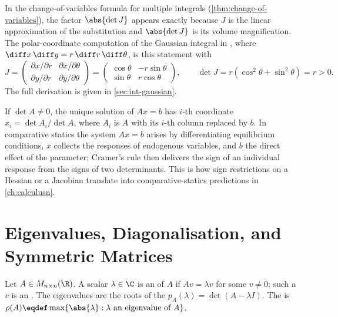 \begin{eg}\label{eg:det-jacobian}
	In the change-of-variables formula for multiple integrals
	(\autoref{thm:change-of-variables}), the factor $\abs{\det J}$ appears exactly
	because $J$ is the linear approximation of the substitution and $\abs{\det J}$
	is its volume magnification. The polar-coordinate computation of the Gaussian
	integral in \autocite[slides 91--93]{fukuda2026calculus}, where
	$\diff x\,\diff y=r\,\diff r\,\diff \theta$, is this statement with
	\[
		J=\begin{pmatrix}\partial x/\partial r & \partial x/\partial\theta\\
			\partial y/\partial r & \partial y/\partial\theta\end{pmatrix}
		=\begin{pmatrix}\cos\theta & -r\sin\theta\\ \sin\theta & r\cos\theta\end{pmatrix},
		\qquad \det J=r(\cos^2\theta+\sin^2\theta)=r>0 .
	\]
	The full derivation is given in \autoref{sec:int-gaussian}.
\end{eg}

\begin{eg}\label{eg:cramer}
	If $\det A\neq0$, the unique solution of $Ax=b$ has $i$-th coordinate
	$x_i=\det A_i/\det A$, where $A_i$ is $A$ with its $i$-th column replaced by
	$b$. In comparative statics the system $Ax=b$ arises by differentiating
	equilibrium conditions, $x$ collects the responses of endogenous variables, and
	$b$ the direct effect of the parameter; Cramer's rule then delivers the sign of
	an individual response from the signs of two determinants. This is how sign
	restrictions on a Hessian or a Jacobian translate into comparative-statics
	predictions in \autoref{ch:calculusn}.
\end{eg}

\section{Eigenvalues, Diagonalisation, and Symmetric Matrices}\label{sec:lin-spectral}

\begin{definition}\label{def:eigen}
	Let $A\in M_{n\times n}(\R)$. A scalar $\lambda\in\C$ is an  of
	$A$ if $Av=\lambda v$ for some $v\neq0$; such a $v$ is an . The
	eigenvalues are the roots of the 
	$p_A(\lambda)=\det(A-\lambda I)$. The  is
	$\rho(A)\eqdef\max\{\abs{\lambda} : \lambda\text{ an eigenvalue of }A\}$.
\end{definition}

